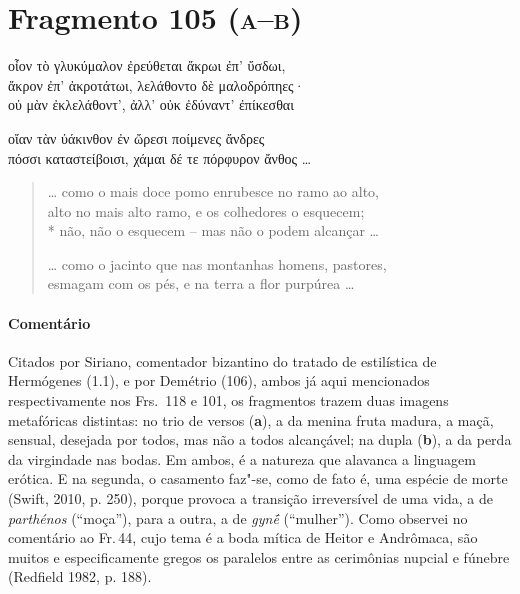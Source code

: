 \pagebreak
\section{Fragmento 105 (\textsc{a--b})}

\begin{gkverse}
οἶον τὸ γλυκύμαλον ἐρεύθεται ἄκρωι ἐπ’ ὔσδωι,\\
ἄκρον ἐπ’ ἀκροτάτωι, λελάθοντο δὲ μαλοδρόπηες·\\
οὐ μὰν ἐκλελάθοντ’, ἀλλ’ οὐκ ἐδύναντ’ ἐπίκεσθαι

\ast\quad\ast\quad\ast

οἴαν τὰν ὐάκινθον ἐν ὤρεσι ποίμενες ἄνδρες\\
πόσσι καταστείβοισι, χάμαι δέ τε πόρφυρον ἄνθος \ldots{}

\end{gkverse}

\begin{verse}
\ldots{} como o mais doce pomo enrubesce no ramo ao alto,\\
alto no mais alto ramo, e os colhedores o esquecem;\\*
não, não o esquecem -- mas não o podem alcançar \ldots{}

\ast\quad\ast\quad\ast

\ldots{} como o jacinto que nas montanhas homens, pastores,\\
esmagam com os pés, e na terra a flor purpúrea \ldots{}
\end{verse}

{\paragraph{Comentário} Citados por Siriano, comentador bizantino do tratado de estilística de
Hermógenes (1.1), e por Demétrio (106), ambos já aqui mencionados respectivamente nos Frs.~118 e 101, os fragmentos trazem duas imagens metafóricas distintas: no trio de versos (\textbf{a}), a da menina fruta madura, a maçã, sensual, desejada por todos,
mas não a todos alcançável; na dupla (\textbf{b}), a da perda da virgindade nas bodas.
Em ambos, é a natureza que alavanca a linguagem erótica.
E na segunda, o casamento faz"-se, como de fato é, uma espécie de morte (Swift, 2010, p. 250), porque provoca a transição irreversível de uma vida, a de \textit{parthénos} (``moça''), para a outra, a de \textit{gynḗ } (``mulher''). Como observei no comentário ao Fr.\,44, cujo tema é a boda mítica de Heitor e Andrômaca, são muitos e especificamente gregos os paralelos entre as cerimônias nupcial e fúnebre (Redfield 1982, p. 188).}


